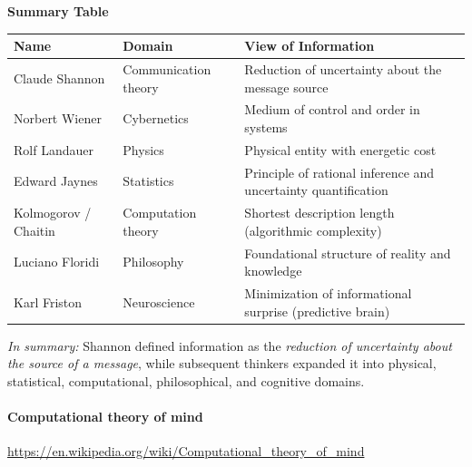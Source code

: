 \documentclass{book}
\providecommand{\ProjectDeepHeading}[2]{%
    \par\medskip\noindent\textbf{#2}\par\smallskip
}
\begin{document}
    \ProjectDeepHeading{2}{Summary Table}
        
        \begin{center}
            \begin{tabular}{|l|l|p{8cm}|}
                \hline
                \textbf{Name}        & \textbf{Domain}      & \textbf{View of Information}                                   \\
                \hline
                Claude Shannon       & Communication theory & Reduction of uncertainty about the message source              \\
                Norbert Wiener       & Cybernetics          & Medium of control and order in systems                         \\
                Rolf Landauer        & Physics              & Physical entity with energetic cost                            \\
                Edward Jaynes        & Statistics           & Principle of rational inference and uncertainty quantification \\
                Kolmogorov / Chaitin & Computation theory   & Shortest description length (algorithmic complexity)           \\
                Luciano Floridi      & Philosophy           & Foundational structure of reality and knowledge                \\
                Karl Friston         & Neuroscience         & Minimization of informational surprise (predictive brain)      \\
                \hline
            \end{tabular}
        \end{center}
        
        \bigskip
        \textit{In summary:}
        Shannon defined information as the \emph{reduction of uncertainty about the source of a message},
        while subsequent thinkers expanded it into physical, statistical, computational, philosophical, and cognitive domains.

\paragraph{Computational theory of mind}


\url{https://en.wikipedia.org/wiki/Computational_theory_of_mind}
\end{document}
